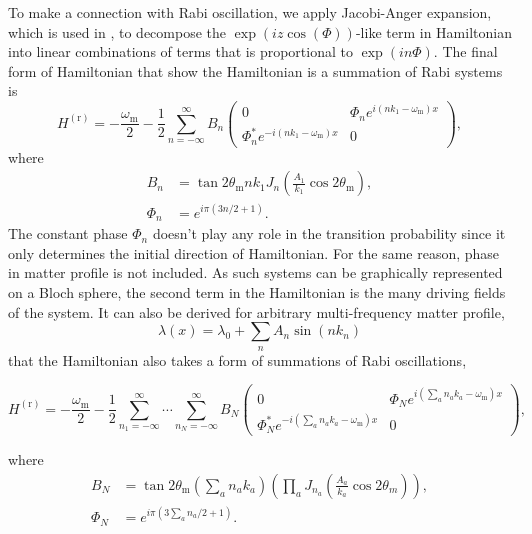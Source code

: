 \documentclass[%
reprint,
 amsmath,amssymb,
 aps,
]{revtex4-1}
\begin{document}
To make a connection with Rabi oscillation, we apply Jacobi-Anger expansion, which is used in \cite{Kneller2013}, to decompose the $\exp\left( i z \cos\left(\Phi \right) \right)$-like term in Hamiltonian into linear combinations of terms that is proportional to $\exp\left(i n \Phi \right)$. The final form of Hamiltonian that show the Hamiltonian is a summation of Rabi systems is
\begin{equation}
    H^{(\mathrm{r})} = -\frac{\omega_{\mathrm{m}}}{2} -  \frac{1}{2} \sum_{n=-\infty}^\infty B_n \begin{pmatrix}
    0 &  \Phi_n e^{i (n k_1-\omega_{\mathrm{m}}) x} \\
     \Phi_n^* e^{ - i (n k_1 -\omega_{\mathrm{m}}) x} & 0
    \end{pmatrix},
\end{equation}
where
\begin{align*}
    B_n &= \tan 2\theta_{\mathrm m} n k_1 J_{n} \left( \frac{A_1}{k_1}\cos 2\theta_{\mathrm m} \right),\\
    \Phi_n &= e^{i\pi (3n/2+1)}.
\end{align*}
The constant phase $\Phi_n$ doesn't play any role in the transition probability since it only determines the initial direction of Hamiltonian. For the same reason, phase in matter profile is not included. As such systems can be graphically represented on a Bloch sphere, the second term in the Hamiltonian is the many driving fields of the system. It can also be derived for arbitrary multi-frequency matter profile,
\begin{equation}
    \lambda(x) = \lambda_0 + \sum_n A_n \sin (n k_n)
\end{equation}
that the Hamiltonian also takes a form of summations of Rabi oscillations,
\begin{widetext}
\begin{equation}
    H^{(\mathrm r)} = -\frac{\omega_{\mathrm m}}{2} - \frac{1}{2} \sum_{n_1=-\infty}^\infty \cdots \sum_{n_N = -\infty}^\infty B_N 
    \begin{pmatrix}
    0 & \Phi_N e^{i\left( \sum_a n_a k_a - \omega_{\mathrm{m}}\right)x} \\
    \Phi_N^* e^{-i\left( \sum_a n_a k_a - \omega_{\mathrm{m}}\right)x} & 0
    \end{pmatrix},
\end{equation}
\end{widetext}
where
\begin{align*}
    B_N &=  \tan 2\theta_{\mathrm m} \left( \sum_a n_a k_a \right) \left( \prod_a J_{n_a}\left( \frac{A_a}{k_a}\cos 2\theta_m \right) \right),\\
    \Phi_N &= e^{i\pi (3\sum_a n_a/2+1)}.
\end{align*}
\end{document}
